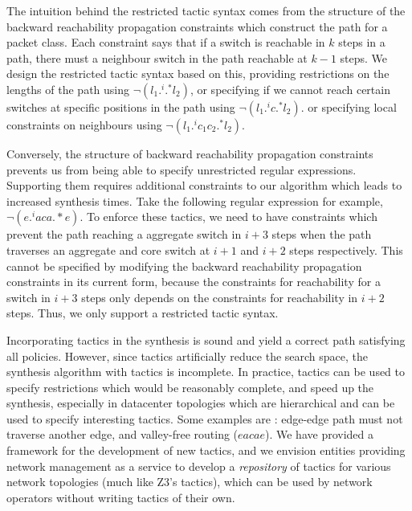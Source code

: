 The intuition behind the restricted tactic syntax comes from the structure of the backward reachability propagation 
constraints which construct the path for a packet class. Each constraint says that if a switch is reachable in $k$ steps in a path,
 there must a neighbour switch in the path reachable at $k-1$ steps. We design the restricted tactic syntax based
  on this, providing restrictions on the lengths of the path using $\neg (l_1 .^i .^* l_2)$, or specifying if we cannot 
  reach certain switches at specific positions in the path using  $\neg (l_1 .^i c .^* l_2)$. or specifying local 
  constraints on neighbours using $\neg (l_1  .^i c_1 c_2 .^* l_2)$.  
  
  Conversely, the structure of backward reachability propagation constraints 
  prevents us from being able to specify unrestricted regular expressions. Supporting them
  requires additional constraints to our algorithm which leads to increased synthesis times. 
  Take the following regular expression for example, $\neg(e .^i a c a .*e)$. To enforce
  these tactics, we need to have constraints which prevent the path reaching a aggregate switch in $i+3$
  steps when the path traverses an aggregate and core switch at $i+1$ and $i+2$ steps
  respectively. This cannot be specified by modifying the backward reachability propagation 
  constraints in its current form, 
  because the constraints for reachability for a switch in $i + 3$ steps only depends on 
  the constraints for reachability in $i+2$ steps. Thus, we only support a restricted tactic syntax.   

Incorporating tactics in the synthesis is sound and yield a correct path satisfying all policies.
 However, since tactics artificially reduce the search space, the synthesis algorithm with tactics is incomplete. 
 In practice, tactics can be used to specify restrictions which would be reasonably complete, 
 and speed up the synthesis, especially in datacenter topologies which are hierarchical 
 and can be used to specify interesting tactics. Some examples are : edge-edge path must not
 traverse another edge, and valley-free routing ($eacae$). We have provided a framework for the
 development of new tactics, and we envision entities providing network
 management as a service to develop a \emph{repository} of tactics for various network topologies 
 (much like Z3's tactics), which can be used by network operators without writing tactics of their own. 

